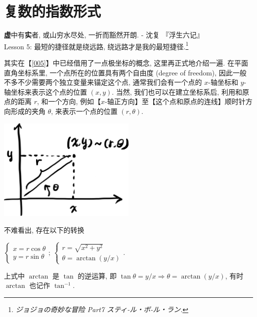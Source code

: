 \section{复数的指数形式}\label{009}

\begin{flushright}{\kaishu \textbf{虚}中有\textbf{实}者, 或山穷水尽处, 一折而豁然开朗. - 沈复
『浮生六记』 \\Lesson 5: 最短的捷径就是绕远路,
绕远路才是我的最短捷径.\footnote{\emph{ジョジョの奇妙な冒险 Part7
  スティ-ル・ボ-ル・ラン}.}}\end{flushright}

\begin{tcolorbox}[size=fbox, breakable, enhanced jigsaw, title={极坐标 (polar coordinate)}]

其实在【\ref{005}】中已经借用了一点极坐标的概念, 这里再正式地介绍一遍.
在平面直角坐标系里, 一个点所在的位置具有两个自由度 (degree of freedom),
因此一般不多不少需要两个独立变量来锚定这个点, 通常我们会有一个点的
$x$-轴坐标和 $y$-轴坐标来表示这个点的位置 $(x,y)$. 当然,
我们也可以在建立坐标系后, 利用和原点的距离 $r$, 和一个方向,
例如【$x$-轴正方向】至【这个点和原点的连线】顺时针方向形成的夹角
$\theta$, 来表示一个点的位置 $(r,\theta)$.

\begin{tcolorbox}[size=fbox, breakable, enhanced jigsaw]
\includegraphics[width=0.5\textwidth]{img/image-20230418112700129.png}

\end{tcolorbox}

不难看出, 存在以下的转换

$\begin{cases}x=r\cos\theta\\y=r\sin\theta\end{cases};\ \begin{cases}r=\sqrt{x^2+y^2}\\\theta=\arctan (y/x)\end{cases}.$

上式中 $\arctan$ 是 $\tan$ 的逆运算, 即
$\tan\theta=y/x\Rightarrow \theta=\arctan (y/x)$, 有时 $\arctan$
也记作 $\tan^{-1}$.

\end{tcolorbox}

